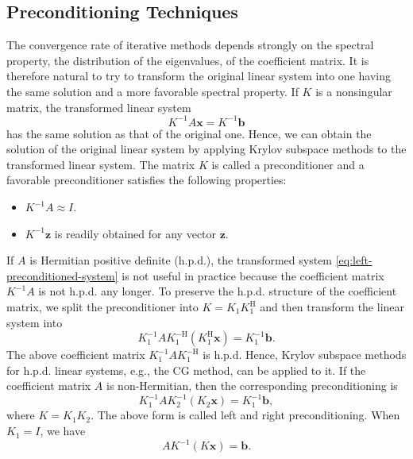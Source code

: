 \subsection{{Preconditioning Techniques}}\label{sec:preconditioning-techniques}
{The convergence rate of iterative methods depends strongly on the spectral property, the distribution of the eigenvalues, of the coefficient matrix. It is therefore natural to try to transform the original linear system into one having the same solution and a more favorable spectral property. If $K$ is a nonsingular matrix, the transformed linear system}
\begin{equation}\label{eq:left-preconditioned-system}K^{-1}A\bm x=K^{-1}\bm b\end{equation}
{has the same solution as that of the original one. Hence, we can obtain the solution of the original linear system by applying Krylov subspace methods to the transformed linear system. The matrix $K$ is called a preconditioner and a favorable preconditioner satisfies the following properties:}
\begin{itemize}\item $K^{-1}A\approx I$.
\item {$K^{-1}\bm z$ is readily obtained for any vector $\bm z$.}\end{itemize}
{If $A$ is Hermitian positive definite (h.p.d.), the transformed system \eqref{eq:left-preconditioned-system} is not useful in practice because the coefficient matrix $K^{-1}A$ is not h.p.d. any longer. To preserve the h.p.d. structure of the coefficient matrix, we split the preconditioner into $K=K_1K_1^{\mathrm H}$ and then transform the linear system into}
\[K_1^{-1}AK_1^{-\mathrm H}(K_1^{\mathrm H}\bm x)=K_1^{-1}\bm b.\]
{The above coefficient matrix $K_1^{-1}AK_1^{-\mathrm H}$ is h.p.d. Hence, Krylov subspace methods for h.p.d. linear systems, e.g., the CG method, can be applied to it. If the coefficient matrix $A$ is non-Hermitian, then the corresponding preconditioning is}
\begin{equation}\label{eq:split-preconditioned-system}K_1^{-1}AK_2^{-1}(K_2\bm x)=K_1^{-1}\bm b,\end{equation}
{where $K=K_1K_2$. The above form is called left and right preconditioning. When $K_1=I$, we have}
\begin{equation}\label{eq:right-preconditioned-system}AK^{-1}(K\bm x)=\bm b.\end{equation}
